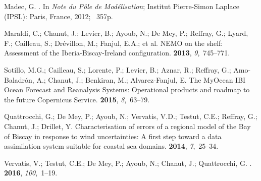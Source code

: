 \documentclass[jmse,article,accept,moreauthors,pdftex]{Definitions/mdpi}
\begin{document}
\begin{thebibliography}{999}
Madec, G.
.
\newblock In {\em Note du P{\^{o}}le de Mod{\'{e}}lisation}; Institut Pierre-Simon
Laplace (IPSL): Paris, France, {2012;}%
~357p.

Maraldi, C.; Chanut, J.; Levier, B.; Ayoub, N.; {De Mey}, P.; Reffray, G.;
Lyard, F.; Cailleau, S.; Dr\'evillon, M.; Fanjul, E.A.; et al.
\newblock NEMO on the shelf: Assessment of the Iberia-Biscay-Ireland
configuration.
 {\bf 2013}, {\em 9},~745--771.

Sotillo, M.G.; Cailleau, S.; Lorente, P.; Levier, B.; Aznar, R.; Reffray, G.;
Amo-Baladrón, A.; Chanut, J.; Benkiran, M.; Alvarez-Fanjul, E.
\newblock The MyOcean IBI Ocean Forecast and Reanalysis Systems: Operational
products and roadmap to the future Copernicus Service.
 {\bf 2015}, {\em
8},~63--79.

Quattrocchi, G.; {De Mey}, P.; Ayoub, N.; Vervatis, V.D.; Testut, C.E.;
Reffray, G.; Chanut, J.; Drillet, Y.
\newblock Characterisation of errors of a regional model of the Bay of Biscay
in response to wind uncertainties: A first step toward a data assimilation
system suitable for coastal sea domains.
 {\bf 2014}, {\em
7},~25--34.

Vervatis, V.; Testut, C.E.; {De Mey}, P.; Ayoub, N.; Chanut, J.; Quattrocchi,
G.
.
 {\bf 2016}, {\em 100},~1--19.


\end{thebibliography}
\end{document}
